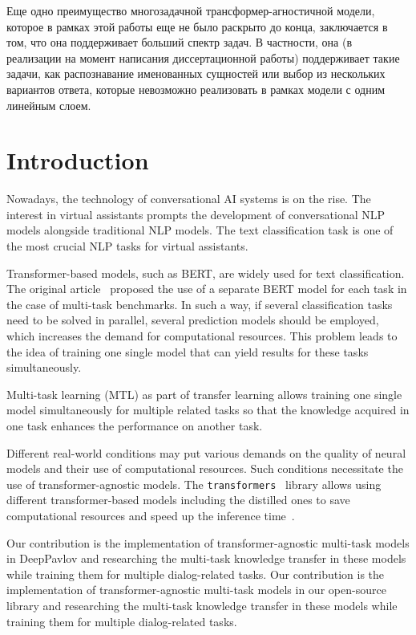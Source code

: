 Еще одно преимущество многозадачной трансформер-агностичной модели, которое в рамках этой работы еще не было раскрыто до конца, заключается в том, что она поддерживает больший спектр задач. В частности, она (в реализации на момент написания диссертационной работы) поддерживает такие задачи, как распознавание именованных сущностей или выбор из нескольких вариантов ответа, которые невозможно реализовать в рамках модели с одним линейным слоем. 







\section{Introduction}
Nowadays, the technology of conversational AI systems is on the rise. The interest in virtual assistants prompts the development of conversational NLP models alongside traditional NLP models. The text classification task is one of the most crucial NLP tasks for virtual assistants.

Transformer-based models, such as BERT, are widely used for text classification. The original article~\cite{bert} proposed the use of a separate BERT model for each task in the case of multi-task benchmarks. In such a way, if several classification tasks need to be solved in parallel, several prediction models should be employed, which increases the demand for computational resources. This problem leads to the idea of training one single model that can yield results for these tasks simultaneously. 

Multi-task learning (MTL) as part of transfer learning allows training one single model simultaneously for multiple related tasks so that the knowledge acquired in one task enhances the performance on another task.

Different real-world conditions may put various demands on the quality of neural models and their use of computational resources. Such conditions necessitate the use of transformer-agnostic models. The \texttt{transformers}~\cite{huggingface_transformers} library allows using different transformer-based models including the distilled ones to save computational resources and speed up the inference time~\cite{alina}. 

\ifinterspeechfinal
Our contribution is the implementation of transformer-agnostic multi-task models in DeepPavlov and researching the multi-task knowledge transfer in these models while training them for multiple dialog-related tasks.
\else
Our contribution is the implementation of transformer-agnostic multi-task models in our open-source library and researching the multi-task knowledge transfer in these models while training them for multiple dialog-related tasks.
\fi

